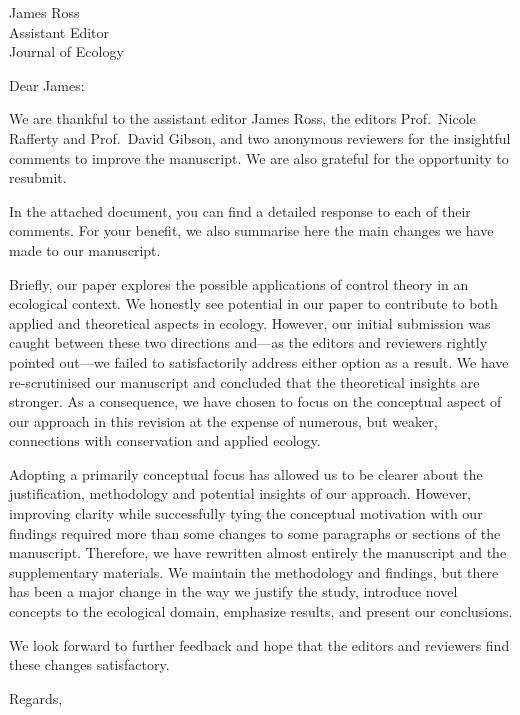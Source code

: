 \documentclass{letter}
\begin{document}
\begin{letter}{James Ross \\ Assistant Editor \\ Journal of Ecology}
\opening{Dear James:}

\onehalfspacing

We are thankful to the assistant editor James Ross, the editors Prof.\ Nicole Rafferty and Prof.\ David Gibson, and two anonymous reviewers for the insightful comments to improve the manuscript. 
We are also grateful for the opportunity to resubmit.

In the attached document, you can find a detailed response to each of their comments. 
For your benefit, we also summarise here the main changes we have made to our manuscript. 

Briefly, our paper explores the possible applications of control theory in an ecological context. 
We honestly see potential in our paper to contribute to both applied and theoretical aspects in ecology. 
However, our initial submission was caught between these two directions and---as the editors and reviewers rightly pointed out---we failed to satisfactorily address either option as a result.
We have re-scrutinised our manuscript and concluded that the theoretical insights are stronger. 
As a consequence, we have chosen to focus on the conceptual aspect of our approach in this revision at the expense of numerous, but weaker, connections with conservation and applied ecology.

Adopting a primarily conceptual focus has allowed us to be clearer about the justification, methodology and potential insights of our approach. 
However, improving clarity while successfully tying the conceptual motivation with our findings required more than some changes to some paragraphs or sections of the manuscript. 
Therefore, we have rewritten almost entirely the manuscript and the supplementary materials. 
We maintain the methodology and findings, but there has been a major change in the way we justify the study, introduce novel concepts to the ecological domain, emphasize results, and present our conclusions. 

We look forward to further feedback and hope that the editors and reviewers find these changes satisfactory.

\closing{Regards,}
\end{letter}
\end{document}
